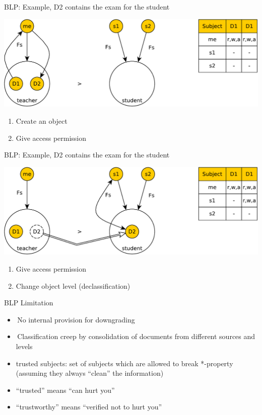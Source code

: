 \documentclass{beamer}
\begin{document}
\begin{frame}[t]{BLP: Example, D2 contains the exam for the student}
  \begin{center}
    \includegraphics[width=0.8\linewidth]{ex11}
  \end{center}
\begin{enumerate}
  \item Create an object
  \item Give access permission
\end{enumerate}
\end{frame}

\begin{frame}[t]{BLP: Example, D2 contains the exam for the student}
  \begin{center}
    \includegraphics[width=0.8\linewidth]{ex12}
  \end{center}
\begin{enumerate}
  \item Give access permission
  \item Change object level (declassification)
\end{enumerate}
\end{frame}

\begin{frame}{BLP Limitation}
  \begin{itemize}
    \item No internal provision for downgrading
    \item Classification creep by consolidation of 
      documents from different sources and levels
    \item \alert{trusted subjects}: set of subjects which are 
      allowed to break *-property (assuming they always 
      ``clean'' the information)
    \item ``trusted''  means ``can hurt you''
    \item ``trustworthy'' means ``verified not to hurt you''
  \end{itemize}
\end{frame}
\end{document}
